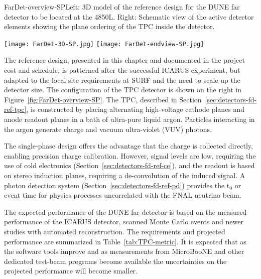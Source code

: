 \begin{cdrfigure}{FarDet-overview-SP}{Left: 3D model of the reference design for the DUNE far detector to be located at the 4850L. Right: Schematic view of the active detector elements showing the plane ordering of the TPC inside the detector.}
\centering
\begin{minipage}[b]{1.0\textwidth}
\begin{center}
\texttt{[image: FarDet-3D-SP.jpg]}
\texttt{[image: FarDet-endview-SP.jpg]}
\end{center}
\end{minipage}
\end{cdrfigure}

The reference design, presented in this chapter and documented in the project cost and schedule, is  
patterned after the successful ICARUS experiment, but adapted to the local site requirements at SURF and the need to scale up the detector size. The configuration of the TPC detector is shown on the right in Figure~\ref{fig:FarDet-overview-SP}.  The TPC, described in Section~\ref{sec:detectors-fd-ref-tpc}, is constructed by placing alternating high-voltage cathode planes and anode readout planes in a bath of ultra-pure liquid argon. Particles interacting in the argon generate charge and vacuum ultra-violet (VUV) photons. 


The single-phase design offers the advantage that the charge is collected directly, enabling precision charge calibration. However, signal levels are low, requiring the use of cold electronics (Section~\ref{sec:detectors-fd-ref-ce}), and the readout is based on stereo induction planes, requiring a de-convolution of the induced signal. A photon detection system (Section~\ref{sec:detectors-fd-ref-pd}) provides the t$_0$ or event time for physics processes uncorrelated with the FNAL neutrino beam.



The expected performance of the DUNE far detector is based on the measured performance of the ICARUS detector, scanned Monte Carlo events and newer studies with automated reconstruction. The requirements and projected performance are summarized in Table~\ref{tab:TPC-metric}. It is expected that as the software tools improve and as measurements from MicroBooNE and other dedicated test-beam programs become available the uncertainties on the projected performance will become smaller.

